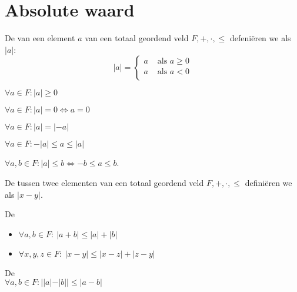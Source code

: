 \documentclass[main.tex]{subfiles}
\begin{document}
\section{Absolute waard}
\label{sec:absolute-waarde}

\begin{de}
  De  van een element $a$ van een totaal geordend veld $F,+,\cdot,\le$ defeni\"eren we als $|a|$:
  \[ 
  |a| = 
  \left\{
    \begin{array}{cl}
      a &\text{ als } a\ge 0\\
      a &\text{ als } a< 0\\
    \end{array}
  \right.
  \]
\end{de}

\begin{pr}
  $\forall a\in F: |a| \ge 0$
\end{pr}

\begin{pr}
  $\forall a\in F: |a| = 0 \Leftrightarrow a = 0$
\end{pr}

\begin{pr}
  $\forall a\in F: |a| = |-a|$
\end{pr}

\begin{pr}
  $\forall a\in F: -|a| \le a \le |a|$
\end{pr}

\begin{pr}
  $\forall a,b\in F: |a| \le b \Leftrightarrow -b \le a \le b$.
\end{pr}

\begin{de}
  De  tussen twee elementen van een totaal geordend veld $F,+,\cdot,\le$ defini\"eren we als $|x-y|$.
\end{de}

\begin{pr}
  De \\
  \begin{itemize}
  \item $\forall a,b\in F:\ |a+b| \le |a| + |b|$
  \item $\forall x,y,z\in F:\ |x-y| \le |x-z| + |z-y|$
  \end{itemize}

\end{pr}

\begin{pr}
  De \\
  $\forall a,b\in F: ||a|-|b|| \le |a-b|$
\end{pr}
\end{document}
